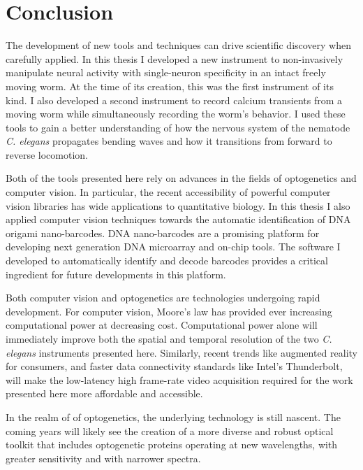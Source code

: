 
\chapter{Conclusion}
The development of new tools and techniques can drive scientific discovery when carefully applied. In this thesis I developed a new instrument to non-invasively manipulate neural activity with single-neuron specificity  in an intact freely moving worm. At the time of its creation, this was the first instrument of its kind. I also developed a second instrument to record calcium transients from a moving worm while simultaneously recording the worm's behavior. I used these tools to gain  a better understanding of how the nervous system of the nematode \textit{C. elegans} propagates bending waves and how it transitions from forward to reverse locomotion.

Both of the tools presented here  rely on advances in the fields of optogenetics and computer vision. In particular, the recent accessibility of powerful computer vision libraries  has wide applications to quantitative biology. In this thesis I also applied computer vision techniques towards the automatic identification of  DNA origami nano-barcodes. DNA nano-barcodes are a promising platform for developing next generation DNA microarray and on-chip tools.  The software I developed to automatically identify and decode barcodes provides a critical ingredient for future developments in this platform. 

Both  computer vision and optogenetics are technologies undergoing rapid development.
For computer vision, Moore's law has provided ever increasing computational power at decreasing cost. Computational power alone will immediately improve both the spatial and temporal resolution of the two \textit{C. elegans} instruments presented here. Similarly, recent trends like augmented reality for consumers, and faster data connectivity standards like Intel's Thunderbolt, will make the low-latency high frame-rate video acquisition  required for the work presented here more affordable and accessible.


In the realm of of optogenetics, the underlying technology is still nascent. The coming years will likely see the creation of a more diverse and robust optical toolkit that includes optogenetic proteins operating at new wavelengths, with greater sensitivity and with narrower spectra.  


